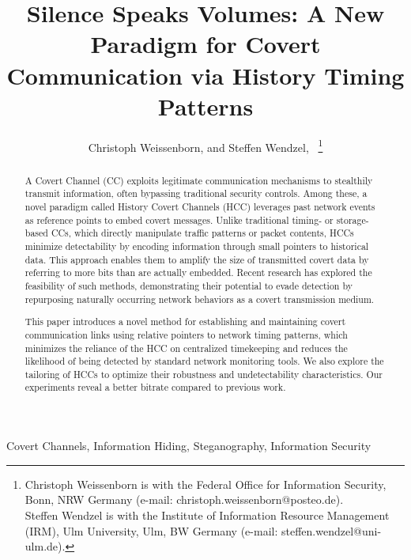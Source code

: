 \documentclass[journal]{IEEEtran}
\begin{document}
\title{Silence Speaks Volumes: A New Paradigm for Covert Communication via History Timing Patterns}
\author{Christoph Weissenborn, and Steffen Wendzel,~
\thanks{Christoph Weissenborn is with the Federal Office for Information Security, Bonn, NRW Germany (e-mail: christoph.weissenborn@posteo.de).\\
Steffen Wendzel is with the Institute of Information Resource Management (IRM), Ulm University, Ulm, BW Germany (e-mail: steffen.wendzel@uni-ulm.de).}}


\maketitle

\begin{abstract}

A Covert Channel (CC) exploits legitimate communication mechanisms to stealthily transmit information, often bypassing traditional security controls. Among these, a novel paradigm called History Covert Channels (HCC) leverages past network events as reference points to embed covert messages. Unlike traditional timing- or storage-based CCs, which directly manipulate traffic patterns or packet contents, HCCs minimize detectability by encoding information through small pointers to historical data. This approach enables them to amplify the size of transmitted covert data by referring to more bits than are actually embedded. Recent research has explored the feasibility of such methods, demonstrating their potential to evade detection by repurposing naturally occurring network behaviors as a covert transmission medium.

This paper introduces a novel method for establishing and maintaining covert communication links using relative pointers to network timing patterns, which minimizes the reliance of the HCC on centralized timekeeping and reduces the likelihood of being detected by standard network monitoring tools. We also explore the tailoring of HCCs to optimize their robustness and undetectability characteristics. Our experiments reveal a better bitrate compared to previous work.
\end{abstract}

\begin{IEEEkeywords}
Covert Channels, Information Hiding, Steganography, Information Security
\end{IEEEkeywords}
\end{document}
